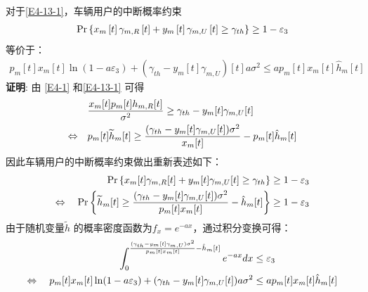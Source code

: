 对于\eqref{E4-13-1}，车辆用户的中断概率约束
\begin{align}
\Pr\left\{x_m\left[t\right]\gamma_{m,R}\left[t\right]+y_m\left[t\right]\gamma_{m,U}\left[t\right] \geq \gamma_{th}\right\}\geq1-\varepsilon_3    \notag
\end{align}
等价于：
\begin{equation} \label{E4-14}
\begin{gathered}
p_m\left[t\right]x_m\left[t\right]\ln \left(1-a \varepsilon_3\right)+(\gamma_{th}-y_m\left[t\right]\gamma_{m,U})\left[t\right] a \sigma^2
\leq a p_m\left[t\right]x_m\left[t\right]\hat{h}\phantom{}_{m}\left[t\right]
\end{gathered}
\end{equation}
\textbf{证明}: 由 \eqref{E4-1} 和\eqref{E4-13-1} 可得
\begin{align} \label{E4-15}
\qquad & \frac{x_m[t]p_m[t]h_{m,R}[t]}{\sigma^2} \geq \gamma_{th} - y_m[t]\gamma_{m,U}[t] \\
\Leftrightarrow \quad
& p_m[t]{\widetilde{h}}\phantom{}_{m}[t] \geq \frac{(\gamma_{th} - y_m[t]\gamma_{m,U}[t])\sigma^2}{x_m[t]} - p_m[t]{\hat{h}}\phantom{}_{m}[t] \notag
\end{align}
因此车辆用户的中断概率约束做出重新表述如下：
\begin{align} \label{E4-16}
\Pr\left\{ x_m[t]\gamma_{m,R}[t] + y_m[t]\gamma_{m,U}[t] \geq \gamma_{th} \right\} &\geq 1 - \varepsilon_3 \\
\Leftrightarrow \quad
\Pr\left\{ {\widetilde{h}}\phantom{}_{m}[t] \geq \frac{(\gamma_{th} - y_m[t]\gamma_{m,U}[t])\sigma^2}{p_m[t]x_m[t]} - {\hat{h}}\phantom{}_{m}[t] \right\} &\geq 1 - \varepsilon_3 \notag
\end{align}
由于随机变量$\widetilde{h}$ 的概率密度函数为$f_x={{e}^{-ax}}$，通过积分变换可得：
\begin{align} \label{E4-17}
\int_{0}^{\frac{(\gamma_{th}-y_m[t]\gamma_{m,U})\sigma^2}{p_m[t]x_m[t]} - \hat{h}\phantom{}_{m}[t]}{e^{-ax}dx} &\leq \varepsilon_3  \\
\Leftrightarrow \quad
p_m[t]x_m[t]\ln(1-a\varepsilon_3) + (\gamma_{th}-y_m[t]\gamma_{m,U}[t])a\sigma^2 &\leq a p_m[t]x_m[t]\hat{h}\phantom{}_{m}[t] \notag
\end{align}

